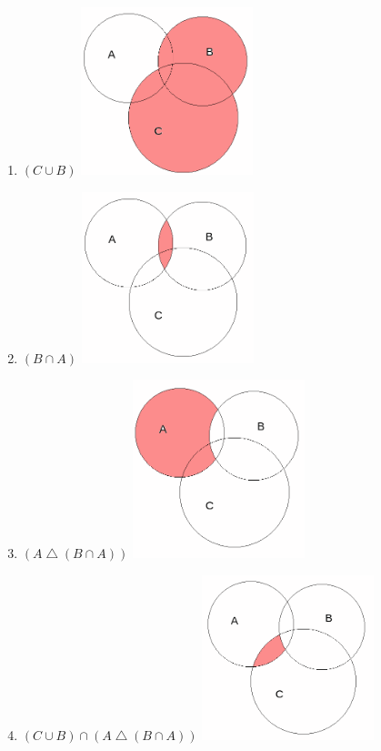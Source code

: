 \documentclass{article}
\begin{document}
\begin{enumerate}
    \item $(C \cup B)$
    \includegraphics[width=50mm]{21.png}
    
    \item $(B \cap A)$
    \includegraphics[width=50mm]{22.png}
    
    \item $(A \bigtriangleup (B \cap A))$
    \includegraphics[width=50mm]{23.png}
    
    \item $(C \cup B) \cap (A \bigtriangleup (B \cap A))$
    \includegraphics[width=50mm]{24.png}
\end{enumerate}
\end{document}
